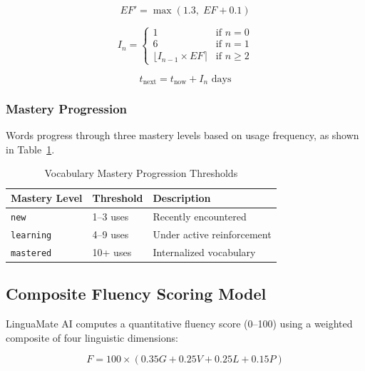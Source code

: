 \documentclass[conference]{IEEEtran}
\begin{document}
\begin{equation}
EF' = \max(1.3, \; EF + 0.1)
\label{eq:ease}
\end{equation}

\begin{equation}
I_n = \begin{cases}
1 & \text{if } n = 0 \\
6 & \text{if } n = 1 \\
\lfloor I_{n-1} \times EF \rceil & \text{if } n \geq 2
\end{cases}
\label{eq:interval}
\end{equation}

\begin{equation}
t_{\text{next}} = t_{\text{now}} + I_n \text{ days}
\label{eq:schedule}
\end{equation}

\subsubsection{Mastery Progression}
Words progress through three mastery levels based on usage frequency, as shown in Table~\ref{tab:mastery}.

\begin{table}[htbp]
\caption{Vocabulary Mastery Progression Thresholds}
\label{tab:mastery}
\centering
\begin{tabular}{@{}lll@{}}
\toprule
\textbf{Mastery Level} & \textbf{Threshold} & \textbf{Description} \\
\midrule
\texttt{new} & 1--3 uses & Recently encountered \\
\texttt{learning} & 4--9 uses & Under active reinforcement \\
\texttt{mastered} & 10+ uses & Internalized vocabulary \\
\bottomrule
\end{tabular}
\end{table}

\subsection{Composite Fluency Scoring Model}

LinguaMate AI computes a quantitative fluency score (0--100) using a weighted composite of four linguistic dimensions:

\begin{equation}
F = 100 \times (0.35G + 0.25V + 0.25L + 0.15P)
\label{eq:fluency}
\end{equation}
\end{document}
